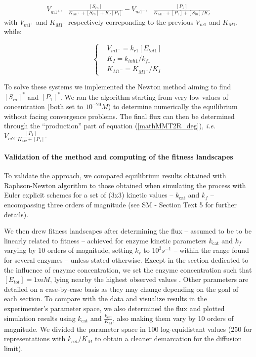 \footnotesize
\begin{equation*}
		\begin{aligned}
		V_{m1^{+}}.&\frac{[S_{in}]}{K_{M1^{+}}+[S_{in}]+K_I [P_1]}-V_{m1^{-}}.&\frac{[P_1]}{K_{M1^{-}}+[P_1]+[S_{in}]/K_I}
		\end{aligned}
		\label{mathMMT1R_rev}
\end{equation*}
\normalsize
with $V_{m1^{+}}$ and $K_{M1^{+}}$ respectively correponding to the previous $V_{m1}$ and $K_{M1}$, while:

\small
\begin{equation*}
  \left\{
      \begin{aligned}
		&V_{m1^{-}}=k_{r1}[E_{tot1}]\\
		&K_I=k_{inh1}/k_{f1}\\
		&K_{M1^{-}}=K_{M1^{+}}/K_I
      \end{aligned}
    \right.
\end{equation*}

\normalsize
To solve these systems %
we implemented the Newton method \citep{Atkinson89} aiming to find $[S_{in}]^*$ and $[P_1]^*$. We ran the algorithm starting from very low values of concentration (both set to $10^{-20}M$) to determine numerically the equilibrium without facing convergence problems. The final flux can then be determined through the ``production'' part of equation (\ref{mathMMT2R_deg}), \textit{i.e.} $V_{m2}.\frac{[P_1]}{K_{M2}+[P_1]}$.


\noindent \paragraph{Validation of the method and computing of the fitness landscapes}

To validate the approach, we compared equilibrium results obtained with Raphson-Newton algorithm to those obtained when simulating the process with Euler explicit schemes for a set of (3x3) kinetic values -- $k_\text{cat}$ and $k_f$ -- encompassing three orders of magnitude (see SM - Section Text 5 for further details).

We then drew fitness landscapes after determining the flux -- assumed to be to be linearly related to fitness -- achieved for enzyme kinetic parameters $k_\text{cat}$ and $k_f$ varying by 10 orders of magnitude, setting $k_r$ to $10^3 s^{-1}$ -- within the range found for several enzymes \citep{Klipp94,Knowles77} -- unless stated otherwise. Except in the section dedicated to the influence of enzyme concentration, we set the enzyme concentration such that $[E_{tot}]=1mM$, lying nearby the highest observed values \citep{Albe90,Noor16}. Other parameters are detailed on a case-by-case basis as they may change depending on the goal of each section. To compare with the data and visualize results in the experimenter's parameter space, we also determined the flux and plotted simulation results using $k_\text{cat}$ and $\frac{k_\text{cat}}{K_M}$, also making them vary by 10 orders of magnitude. We divided the parameter space in 100 log-equidistant values (250 for representations with $k_{cat}/K_M$ to obtain a cleaner demarcation for the diffusion limit).

